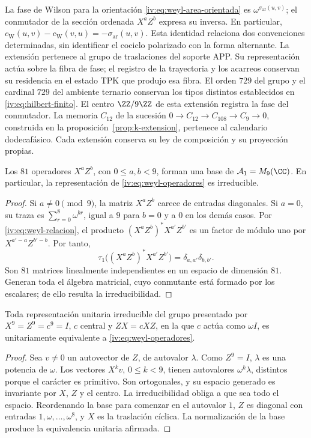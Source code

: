 La fase de Wilson para la orientación
\eqref{iv:eq:weyl-area-orientada} es
\(\omega^{\sigma_{\mathrm{ar}}(u,v)}\); el conmutador de la
sección ordenada \(X^aZ^b\) expresa su inversa. En particular,
\(c_{\mathrm W}(u,v)-c_{\mathrm W}(v,u)
=-\sigma_{\mathrm{ar}}(u,v)\).
Esta identidad relaciona dos convenciones determinadas, sin identificar
el cociclo polarizado con la forma alternante. La extensión pertenece
al grupo de traslaciones del soporte APP. Su representación actúa sobre
la fibra de fase; el registro de la trayectoria y los acarreos conservan
su residencia en el estado TPK que produjo esa fibra. El orden \(729\)
del grupo y el cardinal \(729\) del ambiente ternario conservan los
tipos distintos establecidos en \eqref{iv:eq:hilbert-finito}.
El centro \(\ZZ/9\ZZ\) de esta extensión registra la fase
del conmutador. La memoria \(C_{12}\) de la sucesión
\(0\to C_{12}\to C_{108}\to C_9\to0\), construida en la
proposición~\ref{prop:k-extension}, pertenece al calendario
dodecafásico. Cada extensión conserva su ley de composición y
su proyección propias.

\begin{proposition}
\label{iv:prop:weyl-completo}
Los \(81\) operadores \(X^aZ^b\), con \(0\leq a,b<9\), forman
una base de \(\mathcal A_1=M_9(\CC)\). En particular, la
representación de \eqref{iv:eq:weyl-operadores} es irreducible.
\end{proposition}
\begin{proof}
Si \(a\neq0\pmod9\), la matriz \(X^aZ^b\) carece de entradas
diagonales. Si \(a=0\), su traza es
\(\sum_{r=0}^8\omega^{br}\), igual a \(9\) para \(b=0\) y a
\(0\) en los demás casos. Por \eqref{iv:eq:weyl-relacion}, el
producto \((X^aZ^b)^*X^{a'}Z^{b'}\) es un factor de módulo uno
por \(X^{a'-a}Z^{b'-b}\). Por tanto,
\[
 \tau_1\bigl((X^aZ^b)^*X^{a'}Z^{b'}\bigr)
 =\delta_{a,a'}\delta_{b,b'}.
\]
Son \(81\) matrices linealmente independientes en un espacio de
dimensión \(81\). Generan toda el álgebra matricial, cuyo conmutante
está formado por los escalares; de ello resulta la irreducibilidad.
\end{proof}

\begin{theorem}
\label{iv:thm:weyl-unicidad}
Toda representación unitaria irreducible del grupo presentado por
\(X^9=Z^9=c^9=I\), \(c\) central y \(ZX=cXZ\), en la que
\(c\) actúa como \(\omega I\), es unitariamente equivalente a
\eqref{iv:eq:weyl-operadores}.
\end{theorem}
\begin{proof}
Sea \(v\neq0\) un autovector de \(Z\), de autovalor \(\lambda\).
Como \(Z^9=I\), \(\lambda\) es una potencia de \(\omega\).
Los vectores \(X^kv\), \(0\leq k<9\), tienen autovalores
\(\omega^k\lambda\), distintos porque el carácter es primitivo.
Son ortogonales, y su espacio generado es invariante por \(X\),
\(Z\) y el centro. La irreducibilidad obliga a que sea todo el
espacio. Reordenando la base para comenzar en el autovalor \(1\),
\(Z\) es diagonal con entradas \(1,\omega,\ldots,\omega^8\),
y \(X\) es la traslación cíclica. La normalización de la base
produce la equivalencia unitaria afirmada.
\end{proof}

